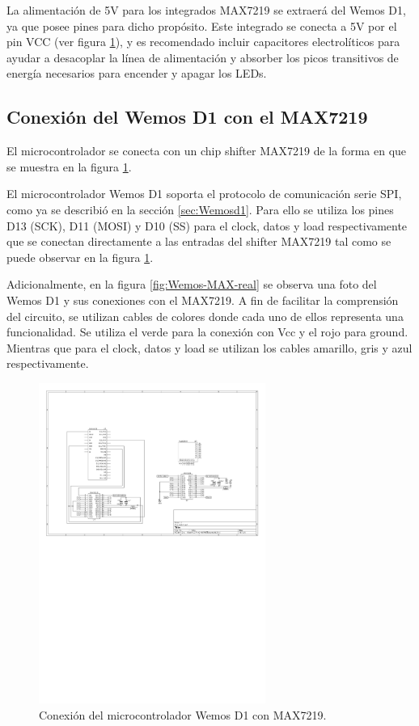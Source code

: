     La alimentación de 5V para los integrados MAX7219 se extraerá del Wemos D1, ya que posee pines para dicho propósito. Este integrado se conecta a 5V por el pin VCC (ver figura \ref{fig:Wemos-MAX}), y es recomendado incluir capacitores electrolíticos para ayudar a desacoplar la línea de alimentación y absorber los picos transitivos de energía necesarios para encender y apagar los LEDs.
    

    \subsection{Conexión del Wemos D1 con el MAX7219}
    El microcontrolador se conecta con un chip shifter MAX7219 de la forma en que se muestra en la figura \ref{fig:Wemos-MAX}.
    
    El microcontrolador Wemos D1 soporta el protocolo de comunicación serie SPI, como ya se describió en la sección \ref{sec:Wemosd1}. Para ello se utiliza los pines D13 (SCK), D11 (MOSI) y D10 (SS) para el clock, datos y load respectivamente que se conectan directamente a las entradas del shifter MAX7219 tal como se puede observar en la figura \ref{fig:Wemos-MAX}.

    Adicionalmente, en la figura \ref{fig:Wemos-MAX-real} se observa una foto del Wemos D1 y sus conexiones con el MAX7219. A fin de facilitar la comprensión del circuito, se utilizan cables de colores donde cada uno de ellos representa una funcionalidad. Se utiliza el verde para la conexión con Vcc y el rojo para ground. Mientras que para el clock, datos y load se utilizan los cables amarillo, gris y azul respectivamente.

    \begin{figure}[ht!]
        \centering
        \begin{center}
            \includegraphics[width=0.66\textwidth]{imagenes/hw-conexiones/conexion-Wemos-MAX.pdf}
            \caption{Conexión del microcontrolador Wemos D1 con MAX7219.}
            \label{fig:Wemos-MAX}
        \end{center}
    \end{figure}
    
